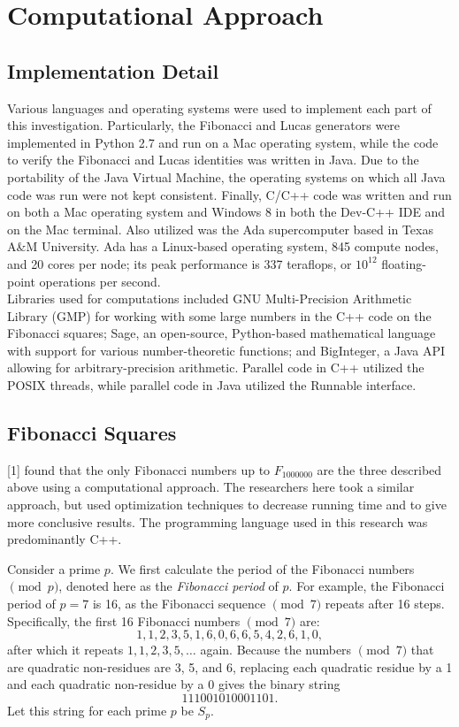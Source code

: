 \documentclass[11pt]{article}
\begin{document}
\section{Computational Approach}
\subsection{Implementation Detail}
Various languages and operating systems were used to implement each part of this investigation. Particularly, the Fibonacci and Lucas generators were implemented in Python 2.7 and run on a Mac operating system, while the code to verify the Fibonacci and Lucas identities was written in Java. Due to the portability of the Java Virtual Machine, the operating systems on which all Java code was run were not kept consistent. Finally, C/C++ code was written and run on both a Mac operating system and Windows 8 in both the Dev-C++ IDE and on the Mac terminal. Also utilized was the Ada supercomputer based in Texas A\&M University. Ada has a Linux-based operating system, 845 compute nodes, and 20 cores per node; its peak performance is 337 teraflops, or $10^{12}$ floating-point operations per second. \\
Libraries used for computations included GNU Multi-Precision Arithmetic Library (GMP) for working with some large numbers in the C++ code on the Fibonacci squares; Sage, an open-source, Python-based mathematical language with support for various number-theoretic functions; and BigInteger, a Java API allowing for arbitrary-precision arithmetic. Parallel code in C++ utilized the POSIX threads, while parallel code in Java utilized the Runnable interface.
\subsection{Fibonacci Squares}
[1] found that the only Fibonacci numbers up to $F_{1000000}$ are the three described above using a computational approach. The researchers here took a similar approach, but used optimization techniques to decrease running time and to give more conclusive results. The programming language used in this research was predominantly C++.


Consider a prime $p$. We first calculate the period of the Fibonacci numbers $\pmod p$, denoted here as the \textit{Fibonacci period} of $p$. For example, the Fibonacci period of $p = 7$ is 16, as the Fibonacci sequence $\pmod 7$ repeats after 16 steps. Specifically, the first 16 Fibonacci numbers $\pmod{7}$ are: \[ 1, 1, 2, 3, 5, 1, 6, 0, 6, 6, 5, 4, 2, 6, 1, 0, \] after which it repeats $1, 1, 2, 3, 5, \dots$ again. Because the numbers $\pmod{7}$ that are quadratic non-residues are 3, 5, and 6, replacing each quadratic residue by a 1 and each quadratic non-residue by a 0 gives the binary string \[111001010001101.\] Let this string for each prime $p$ be $S_p$. 
\end{document}
